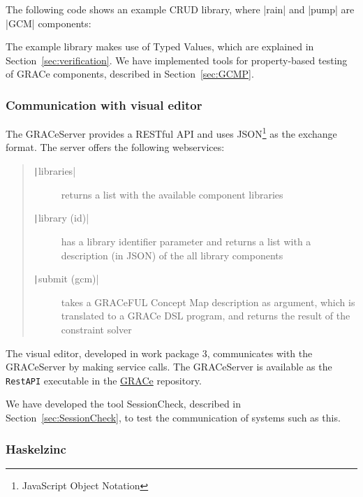 \documentclass{article}
\newcommand{\haskell}[1]{\texttt|#1|}
\begin{document}
The following code shows an example CRUD library, where |rain| and |pump| are
|GCM| components:
The example library makes use of Typed Values, which are explained in
Section~\ref{sec:verification}.
We have implemented tools for property-based testing of GRACe components,
described in Section~\ref{sec:GCMP}.

\subsubsection*{Communication with visual editor}

The GRACeServer provides a RESTful API and uses JSON\footnote{JavaScript Object
Notation} as the exchange format. The server offers the following webservices:
\begin{quote}
\begin{description}
\item [\haskell{libraries}] returns a list with the available component libraries
\item [\haskell{library (id)}] has a library identifier parameter and returns 
  a list with a description (in JSON) of the all library components
\item [\haskell{submit (gcm)}] takes a GRACeFUL Concept Map description as
  argument, which is translated to a GRACe DSL program, and returns the result 
  of the constraint solver
\end{description}
\end{quote}
The visual editor, developed in work package 3, communicates with the GRACeServer
by making service calls. The GRACeServer is available as the \texttt{RestAPI} 
executable in the \href{https://github.com/GRACeFUL-project/GRACe}{GRACe}
repository.

We have developed the tool SessionCheck, described in
Section~\ref{sec:SessionCheck}, to test the communication of systems such as this.

\subsubsection*{Haskelzinc}
\end{document}
